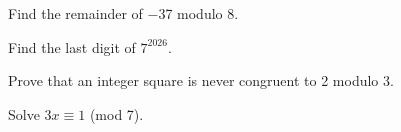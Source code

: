 \documentclass[11pt]{article}
\begin{document}
Find the remainder of −37 modulo 8.\par
\vspace{5pt}
Find the last digit of \(7^{2026}\).\par
\vspace{5pt}
Prove that an integer square is never congruent to 2 modulo 3.\par
\vspace{5pt}
Solve \(3x \equiv  1\) (mod 7).\par
\vspace{5pt}
\end{document}
